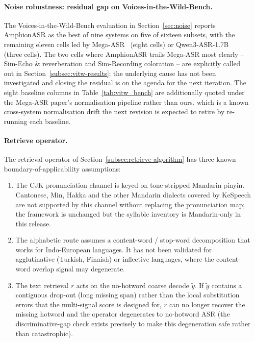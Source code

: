 \paragraph{Noise robustness: residual gap on Voices-in-the-Wild-Bench.}
The Voices-in-the-Wild-Bench evaluation in
Section~\ref{sec:noise} reports AmphionASR as the best of nine
systems on five of sixteen subsets, with the remaining eleven
cells led by Mega-ASR~\cite{xie2026mega} (eight cells) or
Qwen3-ASR-1.7B~\cite{qwen2025qwen3asr} (three cells). The two
cells where AmphionASR trails Mega-ASR most clearly --
Sim-Echo \& reverberation and Sim-Recording coloration -- are
explicitly called out in Section~\ref{subsec:vitw-results}; the
underlying cause has not been investigated and closing the
residual is on the agenda for the next iteration. The eight
baseline columns in Table~\ref{tab:vitw_bench} are additionally
quoted under the Mega-ASR paper's normalisation pipeline rather
than ours, which is a known cross-system normalisation drift the
next revision is expected to retire by re-running each baseline.

\paragraph{Retrieve operator.}
The retrieval operator of
Section~\ref{subsec:retrieve-algorithm} has three known
boundary-of-applicability assumptions:
\begin{enumerate}
  \item The CJK pronunciation channel is keyed on tone-stripped
        Mandarin pinyin. Cantonese, Min, Hakka and the other
        Mandarin dialects covered by KeSpeech are not supported by
        this channel without replacing the pronunciation map; the
        framework is unchanged but the syllable inventory is
        Mandarin-only in this release.
  \item The alphabetic route assumes a content-word / stop-word
        decomposition that works for Indo-European languages. It
        has not been validated for agglutinative (Turkish,
        Finnish) or inflective languages, where the content-word
        overlap signal may degenerate.
  \item The text retrieval $r$ acts on the no-hotword coarse
        decode $\tilde{y}$. If $\tilde{y}$ contains a contiguous
        drop-out (long missing span) rather than the local
        substitution errors that the multi-signal score is
        designed for, $r$ can no longer recover the missing
        hotword and the operator degenerates to no-hotword ASR
        (the discriminative-gap check exists precisely to make
        this degeneration safe rather than catastrophic).
\end{enumerate}


